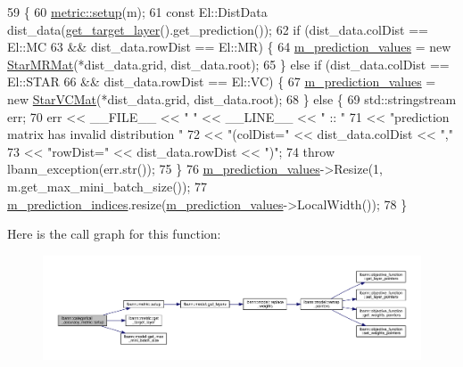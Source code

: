 \begin{DoxyCode}
59                                                 \{
60   \hyperlink{classlbann_1_1metric_a898d23e410297378db2fe9f8d1754fe0}{metric::setup}(m);
61   \textcolor{keyword}{const} El::DistData dist\_data(\hyperlink{classlbann_1_1metric_aba7f7a12aeba6619f7b4330e9075f76e}{get\_target\_layer}().get\_prediction());
62   \textcolor{keywordflow}{if} (dist\_data.colDist == El::MC
63       && dist\_data.rowDist == El::MR) \{
64     \hyperlink{classlbann_1_1categorical__accuracy__metric_a796e50da721050d30e0cea709484154e}{m\_prediction\_values} = \textcolor{keyword}{new} \hyperlink{base_8hpp_a638c3ca7c22f916d23415b234420b9f1}{StarMRMat}(*dist\_data.grid, dist\_data.root);
65   \} \textcolor{keywordflow}{else} \textcolor{keywordflow}{if} (dist\_data.colDist == El::STAR
66              && dist\_data.rowDist == El::VC) \{
67     \hyperlink{classlbann_1_1categorical__accuracy__metric_a796e50da721050d30e0cea709484154e}{m\_prediction\_values} = \textcolor{keyword}{new} \hyperlink{base_8hpp_aa4ec814c4a8f15b4ea2b24b3af94ef23}{StarVCMat}(*dist\_data.grid, dist\_data.root);
68   \} \textcolor{keywordflow}{else} \{
69     std::stringstream err;
70     err << \_\_FILE\_\_ << \textcolor{stringliteral}{" "} << \_\_LINE\_\_ << \textcolor{stringliteral}{" :: "}
71         << \textcolor{stringliteral}{"prediction matrix has invalid distribution "}
72         << \textcolor{stringliteral}{"(colDist="} << dist\_data.colDist << \textcolor{stringliteral}{","}
73         << \textcolor{stringliteral}{"rowDist="} << dist\_data.rowDist << \textcolor{stringliteral}{")"};
74     \textcolor{keywordflow}{throw} lbann\_exception(err.str());
75   \}
76   \hyperlink{classlbann_1_1categorical__accuracy__metric_a796e50da721050d30e0cea709484154e}{m\_prediction\_values}->Resize(1, m.get\_max\_mini\_batch\_size());
77   \hyperlink{classlbann_1_1categorical__accuracy__metric_a369a86a91f08f3ad3b12b870ccf2e427}{m\_prediction\_indices}.resize(\hyperlink{classlbann_1_1categorical__accuracy__metric_a796e50da721050d30e0cea709484154e}{m\_prediction\_values}->LocalWidth());
78 \}
\end{DoxyCode}
Here is the call graph for this function\+:\nopagebreak
\begin{figure}[H]
\begin{center}
\leavevmode
\includegraphics[width=350pt]{classlbann_1_1categorical__accuracy__metric_a328a63ccc21c31efd511445f5b060960_cgraph}
\end{center}
\end{figure}
